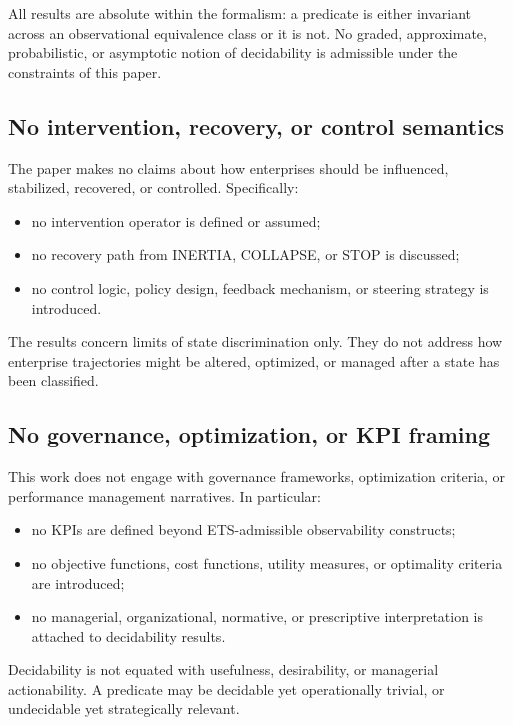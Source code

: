 All results are absolute within the formalism: a predicate is either
invariant across an observational equivalence class or it is not.
No graded, approximate, probabilistic, or asymptotic notion of
decidability is admissible under the constraints of this paper.

\subsection{No intervention, recovery, or control semantics}
\label{subsec:no-control}

The paper makes no claims about how enterprises should be influenced,
stabilized, recovered, or controlled. Specifically:
\begin{itemize}
\item no intervention operator is defined or assumed;
\item no recovery path from INERTIA, COLLAPSE, or STOP is discussed;
\item no control logic, policy design, feedback mechanism, or steering
      strategy is introduced.
\end{itemize}

The results concern limits of state discrimination only. They do not
address how enterprise trajectories might be altered, optimized, or
managed after a state has been classified.

\subsection{No governance, optimization, or KPI framing}
\label{subsec:no-governance}

This work does not engage with governance frameworks, optimization
criteria, or performance management narratives. In particular:
\begin{itemize}
\item no KPIs are defined beyond ETS-admissible observability constructs;
\item no objective functions, cost functions, utility measures, or
      optimality criteria are introduced;
\item no managerial, organizational, normative, or prescriptive
      interpretation is attached to decidability results.
\end{itemize}

Decidability is not equated with usefulness, desirability, or managerial
actionability. A predicate may be decidable yet operationally trivial,
or undecidable yet strategically relevant.

